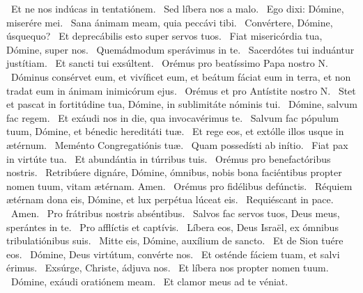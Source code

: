  \V\ Et ne nos indúcas in tentatiónem. \R\ Sed líbera nos a malo. \V\ Ego dixi: Dómine, miserére mei. \R\ Sana ánimam meam, quia peccávi tibi. \V\ Convértere, Dómine, úsquequo? \R\ Et deprecábilis esto super servos tuos. \V\ Fiat misericórdia tua, Dómine, super nos. \R\ Quemádmodum sperávimus in te. \V\ Sacerdótes tui induántur justítiam. \R\ Et sancti tui exsúltent. \V\ Orémus pro beatíssimo Papa nostro N. \R\ Dóminus consérvet eum, et vivíficet eum, et beátum fáciat eum in terra, et non tradat eum in ánimam inimicórum ejus. \V\ Orémus et pro Antístite nostro N. \R\ Stet et pascat in fortitúdine tua, Dómine, in sublimitáte nóminis tui. \V\ Dómine, salvum fac regem. \R\ Et exáudi nos in die, qua invocavérimus te. \V\ Salvum fac pópulum tuum, Dómine, et bénedic hereditáti tuæ. \R\ Et rege eos, et extólle illos usque in ætérnum. \V\ Meménto Congregatiónis tuæ. \R\ Quam possedísti ab inítio. \V\ Fiat pax in virtúte tua. \R\ Et abundántia in túrribus tuis. \V\ Orémus pro benefactóribus nostris. \R\ Retribúere dignáre, Dómine, ómnibus, nobis bona faciéntibus propter nomen tuum, vitam ætérnam. Amen. \V\ Orémus pro fidélibus defúnctis. \R\ Réquiem ætérnam dona eis, Dómine, et lux perpétua lúceat eis. \V\ Requiéscant in pace. \R\ Amen. \V\ Pro frátribus nostris abséntibus. \R\ Salvos fac servos tuos, Deus meus, sperántes in te. \V\ Pro afflíctis et captívis. \R\ Líbera eos, Deus Israël, ex ómnibus tribulatiónibus suis. \V\ Mitte eis, Dómine, auxílium de sancto. \R\ Et de Sion tuére eos. \V\ Dómine, Deus virtútum, convérte nos. \R\ Et osténde fáciem tuam, et salvi érimus. \V\ Exsúrge, Christe, ádjuva nos. \R\ Et líbera nos propter nomen tuum. \V\ Dómine, exáudi oratiónem meam. \R\ Et clamor meus ad te véniat.


\sectionornament



